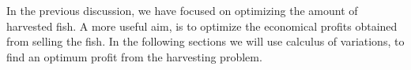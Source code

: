In the previous discussion, we have focused on optimizing the amount of harvested fish. A more useful aim, is to optimize the economical profits obtained from selling the fish. In the following sections we will use calculus of variations, to find an optimum profit from the harvesting problem.